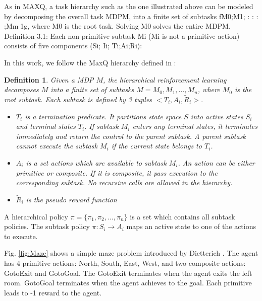 \documentclass{article} %
\newtheorem{definition}{Definition}
\begin{document}

As in MAXQ, a task hierarchy such as the one illustrated above can be modeled by
decomposing the overall task MDPM, into a finite set of subtasks fM0;M1; : : : ;Mm􀀀1g,
where M0 is the root task. Solving M0 solves the entire MDPM.
Definition 3.1: Each non-primitive subtask Mi (Mi is not a primitive action) consists
of five components (Si; Ii; Ti;Ai;Ri):

In this work, we follow the MaxQ hierarchy defined in \cite{MaxQ}:
\begin{definition}
    Given a MDP $M$, the hierarchical reinforcement learning decomposes $M$ into a finite
    set of subtasks $M = {M_0, M_1, \dots, M_n}$, where $M_0$ is the root subtask. 
    Each subtask is defined by 3 tuples $<T_i, A_i, \tilde{R}_i>$. 
    \begin{itemize}{}
    \item $T_i$ is a termination predicate. It partitions state space $S$ into active states $S_i$ and
                terminal states $T_i$. If subtask $M_i$ enters any terminal states, it terminates immediately
                and return the control to the parent subtask. A parent subtask cannot execute the subtask
                $M_i$ if the current state belongs to $T_i$.
    \item $A_i$ is a set actions which are available to subtask $M_i$. An action can be either primitive or composite.
                If it is composite, it pass execution to the corresponding subtask. No recursive calls 
                are allowed in the hierarchy.
    \item $\tilde{R}_i$ is the pseudo reward function 
    \end{itemize}
\end{definition}
A hierarchical policy $\pi = \{\pi_1, \pi_2, \dots, \pi_n\}$ is a set which contains all subtask policies. 
The subtask policy $\pi: S_i \rightarrow A_i$ maps an active state to one of the actions to execute.

Fig. \ref{fig:Maze} shows a simple maze problem introduced by Dietterich \cite{MaxQJ}.
The agent has 4 primitive actions: North, South, East, West, and two composite actions: GotoExit and GotoGoal.
The 
GotoExit terminates when the agent exits the left room. GotoGoal terminates when the agent achieves to the goal.
Each primitive leads to -1 reward to the agent.
\end{document}
